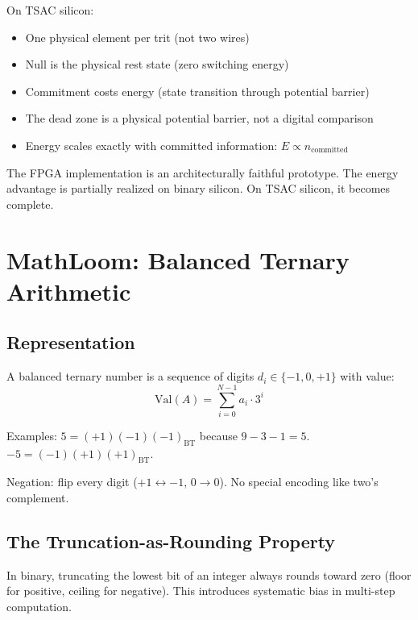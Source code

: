 \documentclass[11pt,a4paper]{article}
\begin{document}
On TSAC silicon:
\begin{itemize}
    \item One physical element per trit (not two wires)
    \item Null is the physical rest state (zero switching energy)
    \item Commitment costs energy (state transition through potential barrier)
    \item The dead zone is a physical potential barrier, not a digital comparison
    \item Energy scales exactly with committed information: $E \propto n_{\text{committed}}$
\end{itemize}

The FPGA implementation is an architecturally faithful prototype. The energy advantage is partially realized on binary silicon. On TSAC silicon, it becomes complete.

\section{MathLoom: Balanced Ternary Arithmetic}

\subsection{Representation}

A balanced ternary number is a sequence of digits $d_i \in \{-1, 0, +1\}$ with value:
\begin{equation}
\text{Val}(A) = \sum_{i=0}^{N-1} a_i \cdot 3^i
\end{equation}

Examples: $5 = (+1)(-1)(-1)_{\text{BT}}$ because $9 - 3 - 1 = 5$. $-5 = (-1)(+1)(+1)_{\text{BT}}$.

Negation: flip every digit ($+1 \leftrightarrow -1$, $0 \rightarrow 0$). No special encoding like two's complement.

\subsection{The Truncation-as-Rounding Property}

In binary, truncating the lowest bit of an integer always rounds toward zero (floor for positive, ceiling for negative). This introduces systematic bias in multi-step computation.
\end{document}
